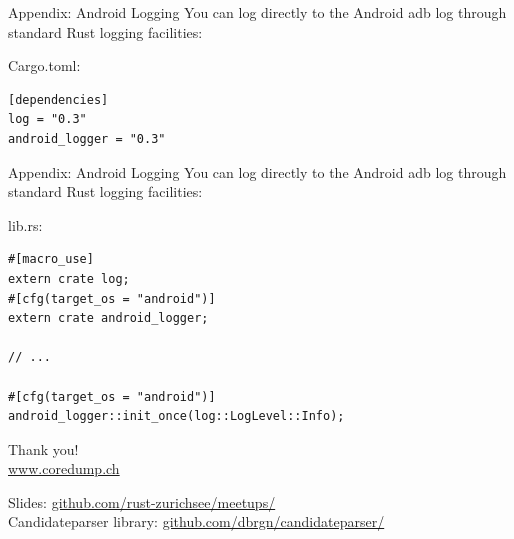 \documentclass[aspectratio=1610,14pt,t]{beamer}
\begin{document}
\begin{frame}[c,fragile]{Appendix: Android Logging}
  You can log directly to the Android adb log through standard Rust logging
  facilities:

  Cargo.toml:

  \begin{verbatim}
[dependencies]
log = "0.3"
android_logger = "0.3"
  \end{verbatim}
\end{frame}

\begin{frame}[c,fragile]{Appendix: Android Logging}
  You can log directly to the Android adb log through standard Rust logging
  facilities:

  lib.rs:

  \begin{verbatim}
#[macro_use]
extern crate log;
#[cfg(target_os = "android")]
extern crate android_logger;

// ...

#[cfg(target_os = "android")]
android_logger::init_once(log::LogLevel::Info);
  \end{verbatim}
\end{frame}


{
\begin{frame}[standout]
	\begin{centering}
	{\Huge Thank you!}\\
	{\normalsize \url{www.coredump.ch}}\\
	\end{centering}
  {\small Slides: \url{github.com/rust-zurichsee/meetups/}}\\
  {\small Candidateparser library: \url{github.com/dbrgn/candidateparser/}}
  \vspace{3cm}
\end{frame}
}
\end{document}
